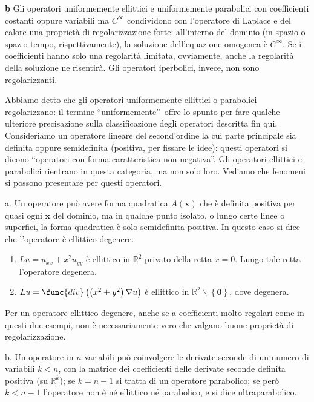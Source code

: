 \documentclass{article}
\begin{document}
\textbf{b} Gli operatori uniformemente ellittici e uniformemente parabolici
con coefficienti costanti oppure variabili ma $C^{\infty }$ condividono con
l'operatore di Laplace e del calore una propriet\`{a} di regolarizzazione
forte: all'interno del dominio (in spazio o spazio-tempo, rispettivamente),
la soluzione dell'equazione omogenea \`{e} $C^{\infty }$. Se i coefficienti
hanno solo una regolarit\`{a} limitata, ovviamente, anche la regolarit\`{a}
della soluzione ne risentir\`{a}. Gli operatori iperbolici, invece, non sono
regolarizzanti.

Abbiamo detto che gli operatori uniformemente ellittici o parabolici
regolarizzano: il termine \textquotedblleft uniformemente\textquotedblright\
offre lo spunto per fare qualche ulteriore precisazione sulla
classificazione degli operatori descritta fin qui. Consideriamo un operatore
lineare del second'ordine la cui parte principale sia definita oppure
semidefinita (positiva, per fissare le idee): questi operatori si dicono
\textquotedblleft operatori con forma caratteristica non
negativa\textquotedblright . Gli operatori ellittici e parabolici rientrano
in questa categoria, ma non solo loro. Vediamo che fenomeni si possono
presentare per questi operatori.

a. Un operatore pu\`{o} avere forma quadratica $A\left( \mathbf{x}\right) $
che \`{e} definita positiva per quasi ogni $\mathbf{x}$ del dominio, ma in
qualche punto isolato, o lungo certe linee o superfici, la forma quadratica 
\`{e} solo semidefinita positiva. In questo caso si dice che l'operatore 
\`{e} ellittico degenere.

\begin{enumerate}
\item $Lu=u_{xx}+x^{2}u_{yy}$ \`{e} ellittico in $%
\mathbb{R}
^{2}$ privato della retta $x=0$. Lungo tale retta l'operatore degenera.

\item $Lu=\func{div}\left( \left( x^{2}+y^{2}\right) \nabla u\right) $ \`{e}
ellittico in $%
\mathbb{R}
^{2}\backslash \left\{ \mathbf{0}\right\} $, dove degenera.
\end{enumerate}

Per un operatore ellittico degenere, anche se a coefficienti molto regolari
come in questi due esempi, non \`{e} necessariamente vero che valgano buone
propriet\`{a} di regolarizzazione.

b. Un operatore in $n$ variabili pu\`{o} coinvolgere le derivate seconde di
un numero di variabili $k<n$, con la matrice dei coefficienti delle derivate
seconde definita positiva (su $%
\mathbb{R}
^{k}$); se $k=n-1$ si tratta di un operatore parabolico; se per\`{o} $k<n-1$
l'operatore non \`{e} n\'{e} ellittico n\'{e} parabolico, e si dice
ultraparabolico.
\end{document}
